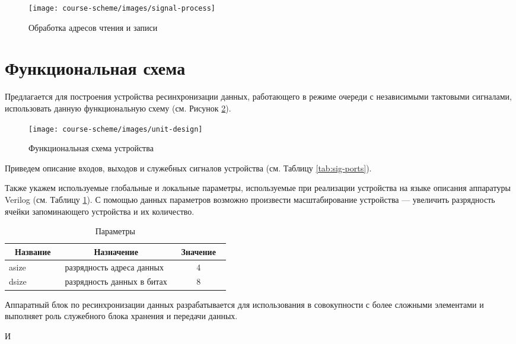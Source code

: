 \begin{figure}
	\centering
	\texttt{[image: course-scheme/images/signal-process]}
	\caption{Обработка адресов чтения и записи}
	\label{fig:signal-process}
\end{figure}



\section{Функциональная схема}
Предлагается для построения устройства ресинхронизации данных, работающего в режиме очереди с независимыми тактовыми сигналами, использовать данную функциональную схему (см. Рисунок \ref{fig:unit-design}).

\begin{figure}[h!]
	\centering
	\texttt{[image: course-scheme/images/unit-design]}
	\caption{Функциональная схема устройства}
	\label{fig:unit-design}
\end{figure}


Приведем описание входов, выходов и служебных сигналов устройства (см. Таблицу \ref{tab:sig-ports}).

Также укажем используемые глобальные и локальные параметры, используемые при реализации устройства на языке описания аппаратуры Verilog (см. Таблицу \ref{tab:params}). С помощью данных параметров возможно произвести масштабирование устройства --- увеличить разрядность ячейки запоминающего устройства и их количество.

\begin{table}[htbp]
	\centering
	\fontsize{12}{16pt}\selectfont
	\caption{Параметры}
	\begin{tabular}{|l|p{0.5\linewidth}|c|}
		\hline
		\multicolumn{1}{|c}{\textbf{Название}} & \multicolumn{1}{|c|}{\textbf{Назначение}} & \multicolumn{1}{c|}{\textbf{Значение}} \\ \hline
		asize  &  разрядность адреса данных & 4 \\ \hline
		dsize  &  разрядность данных в битах & 8 \\ \hline
	\end{tabular}
	\label{tab:params}
\end{table}

Аппаратный блок по ресинхронизации данных разрабатывается для использования в совокупности с более сложными элементами и выполняет роль служебного блока хранения и передачи данных.

И



